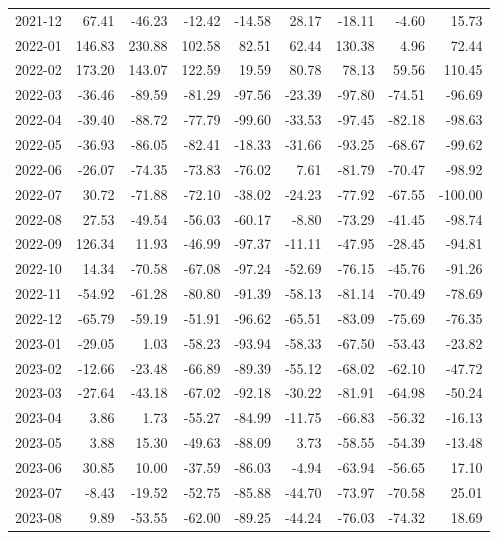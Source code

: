 \begin{table}[ht]
\begin{tabular}{lrrrrrrrr}
  2021-12 & 67.41 & -46.23 & -12.42 & -14.58 & 28.17 & -18.11 & -4.60 & 15.73 \\ 
  2022-01 & 146.83 & 230.88 & 102.58 & 82.51 & 62.44 & 130.38 & 4.96 & 72.44 \\ 
  2022-02 & 173.20 & 143.07 & 122.59 & 19.59 & 80.78 & 78.13 & 59.56 & 110.45 \\ 
  2022-03 & -36.46 & -89.59 & -81.29 & -97.56 & -23.39 & -97.80 & -74.51 & -96.69 \\ 
  2022-04 & -39.40 & -88.72 & -77.79 & -99.60 & -33.53 & -97.45 & -82.18 & -98.63 \\ 
  2022-05 & -36.93 & -86.05 & -82.41 & -18.33 & -31.66 & -93.25 & -68.67 & -99.62 \\ 
  2022-06 & -26.07 & -74.35 & -73.83 & -76.02 & 7.61 & -81.79 & -70.47 & -98.92 \\ 
  2022-07 & 30.72 & -71.88 & -72.10 & -38.02 & -24.23 & -77.92 & -67.55 & -100.00 \\ 
  2022-08 & 27.53 & -49.54 & -56.03 & -60.17 & -8.80 & -73.29 & -41.45 & -98.74 \\ 
  2022-09 & 126.34 & 11.93 & -46.99 & -97.37 & -11.11 & -47.95 & -28.45 & -94.81 \\ 
  2022-10 & 14.34 & -70.58 & -67.08 & -97.24 & -52.69 & -76.15 & -45.76 & -91.26 \\ 
  2022-11 & -54.92 & -61.28 & -80.80 & -91.39 & -58.13 & -81.14 & -70.49 & -78.69 \\ 
  2022-12 & -65.79 & -59.19 & -51.91 & -96.62 & -65.51 & -83.09 & -75.69 & -76.35 \\ 
  2023-01 & -29.05 & 1.03 & -58.23 & -93.94 & -58.33 & -67.50 & -53.43 & -23.82 \\ 
  2023-02 & -12.66 & -23.48 & -66.89 & -89.39 & -55.12 & -68.02 & -62.10 & -47.72 \\ 
  2023-03 & -27.64 & -43.18 & -67.02 & -92.18 & -30.22 & -81.91 & -64.98 & -50.24 \\ 
  2023-04 & 3.86 & 1.73 & -55.27 & -84.99 & -11.75 & -66.83 & -56.32 & -16.13 \\ 
  2023-05 & 3.88 & 15.30 & -49.63 & -88.09 & 3.73 & -58.55 & -54.39 & -13.48 \\ 
  2023-06 & 30.85 & 10.00 & -37.59 & -86.03 & -4.94 & -63.94 & -56.65 & 17.10 \\ 
  2023-07 & -8.43 & -19.52 & -52.75 & -85.88 & -44.70 & -73.97 & -70.58 & 25.01 \\ 
  2023-08 & 9.89 & -53.55 & -62.00 & -89.25 & -44.24 & -76.03 & -74.32 & 18.69 \\ 

\end{tabular}
\end{table}
